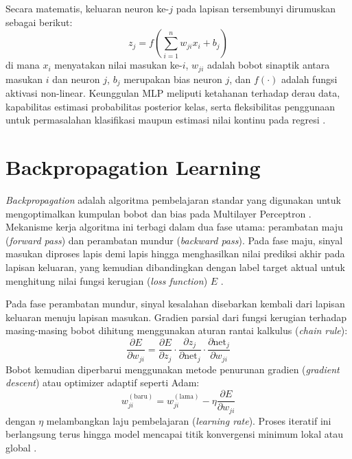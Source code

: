 \documentclass[a4paper,oneside,12pt]{report}
\begin{document}
Secara matematis, keluaran neuron ke-$j$ pada lapisan tersembunyi dirumuskan sebagai berikut:
\begin{equation}
    z_j = f \left( \sum_{i=1}^{n} w_{ji} x_i + b_j \right)
\end{equation}
di mana $x_i$ menyatakan nilai masukan ke-$i$, $w_{ji}$ adalah bobot sinaptik antara masukan $i$ dan neuron $j$, $b_j$ merupakan bias neuron $j$, dan $f(\cdot)$ adalah fungsi aktivasi non-linear. Keunggulan MLP meliputi ketahanan terhadap derau data, kapabilitas estimasi probabilitas posterior kelas, serta fleksibilitas penggunaan untuk permasalahan klasifikasi maupun estimasi nilai kontinu pada regresi \cite{ref_pardede}.

\section{Backpropagation Learning}
\textit{Backpropagation} adalah algoritma pembelajaran standar yang digunakan untuk mengoptimalkan kumpulan bobot dan bias pada Multilayer Perceptron \cite{ref_goodfellow}. Mekanisme kerja algoritma ini terbagi dalam dua fase utama: perambatan maju (\textit{forward pass}) dan perambatan mundur (\textit{backward pass}). Pada fase maju, sinyal masukan diproses lapis demi lapis hingga menghasilkan nilai prediksi akhir pada lapisan keluaran, yang kemudian dibandingkan dengan label target aktual untuk menghitung nilai fungsi kerugian (\textit{loss function}) $E$ \cite{ref_haykin}.

Pada fase perambatan mundur, sinyal kesalahan disebarkan kembali dari lapisan keluaran menuju lapisan masukan. Gradien parsial dari fungsi kerugian terhadap masing-masing bobot dihitung menggunakan aturan rantai kalkulus (\textit{chain rule}):
\begin{equation}
    \frac{\partial E}{\partial w_{ji}} = \frac{\partial E}{\partial z_j} \cdot \frac{\partial z_j}{\partial \text{net}_j} \cdot \frac{\partial \text{net}_j}{\partial w_{ji}}
\end{equation}
Bobot kemudian diperbarui menggunakan metode penurunan gradien (\textit{gradient descent}) atau optimizer adaptif seperti Adam:
\begin{equation}
    w_{ji}^{(\text{baru})} = w_{ji}^{(\text{lama})} - \eta \frac{\partial E}{\partial w_{ji}}
\end{equation}
dengan $\eta$ melambangkan laju pembelajaran (\textit{learning rate}). Proses iteratif ini berlangsung terus hingga model mencapai titik konvergensi minimum lokal atau global \cite{ref_goodfellow}.
\end{document}
